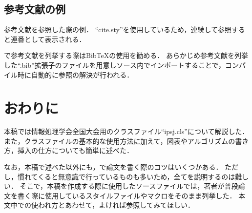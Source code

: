\documentclass[lualatex]{ipsj}
\begin{document}
  \subsection{参考文献の例}
  参考文献を参照した際の例\cite{book:Aho2006,icde:Diao2002,new-gen-comp:Kowalski1989,tech:Hopcroft1971,url:grep}．
  ``cite.sty''を使用しているため，連続して参照すると連番として表示される．
  
  {\LaTeXe}で参考文献を列挙する際はBibTeXの使用を勧める．
  あらかじめ参考文献を列挙した``.bib''拡張子のファイルを用意し{\LaTeXe}ソース内でインポートすることで，コンパイル時に自動的に参照の解決が行われる．
  
  
\section{おわりに}
本稿では情報処理学会全国大会用のクラスファイル``ipsj.cls''について解説した．
また，クラスファイルの基本的な使用方法に加えて，図表やアルゴリズムの書き方，挿入の仕方についても簡単に述べた．

なお，本稿で述べた以外にも，{\LaTeXe}で論文を書く際のコツはいくつかある．
ただし，慣れてくると無意識で行っているものも多いため，全てを説明するのは難しい．
そこで，本稿を作成する際に使用したソースファイルでは，著者が普段論文を書く際に使用しているスタイルファイルやマクロをそのまま列挙した．
本文中での使われ方とあわせて，よければ参照してみてほしい．

\small


\end{document}
